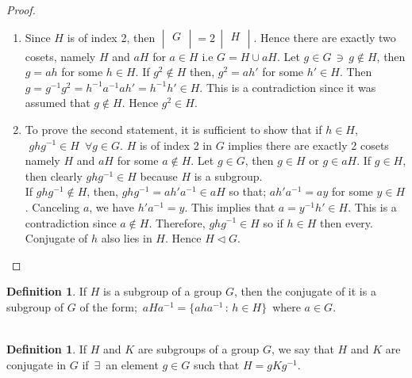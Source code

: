 \documentclass[11pt,a4paper]{article}
\theoremstyle{definition}
\newtheorem{defn}[thm]{Definition}
\begin{document}
\begin{proof}
\begin{enumerate}
\item[(i)] Since $H$ is of index 2, then $\begin{vmatrix}
G\\
\end{vmatrix} = 2\, \begin{vmatrix}
H\\
\end{vmatrix}$. Hence there are exactly two cosets, namely $H$ and $a H$ for $a\in H$ i.e $G = H\cup aH$. Let $g\in G\,\ni\, g\not\in H$, then $g = ah$ for some $h\in H$. If $g^2\not\in H$ then, $g^2 = ah'$ for some $h'\in H$. Then $g = g^{-1}g^2 = h^{-1}a^{-1}ah' = h^{-1}h'\in H$. This is a contradiction since it was assumed that $g\not\in H$. Hence $g^2\in H$.

\item[(ii)] To prove the second statement, it is sufficient to show that if $h\in H$, $\, \, ghg^{-1}\in H\,\,\, \forall g\in G$. $H$ is of index 2 in $G$ implies there are exactly 2 cosets namely $H$ and $aH$ for some $a\not\in H$. Let $g\in G$, then $g\in H$ or $g\in aH$. If $g\in H$, then clearly $ghg^{-1}\in H$ because $H$ is a subgroup.\\
If $ghg^{-1}\not\in H$, then, $ghg^{-1} = ah'a^{-1}\in aH$ so that; $ah'a^{-1} = ay$ for some $y\in H$. Canceling $a$, we have $h'a^{-1} = y$. This implies that $a = y^{-1}h'\in H$. This is a contradiction since $a\not\in H$. Therefore, $ghg^{-1}\in H$ so if $h\in H$ then every. Conjugate of $h$ also lies in $H$. Hence $H\vartriangleleft G$.\\
\end{enumerate}
\end{proof}







\begin{defn}
If $H$ is a subgroup of a group $G$, then the conjugate of it is a subgroup of $G$ of the form; $\, aHa^{-1} = \{aha^{-1}\, :\, h\in H\}\,$ where $a\in G$.\\\\
\end{defn}



\begin{defn}
If $H$ and $K$ are subgroups of a group $G$, we say that $H$ and $K$ are conjugate in $G$ if $\, \exists\,$ an element $g\in G$ such that $H = gKg^{-1}$.\\\\\\
\end{defn}
\end{document}

